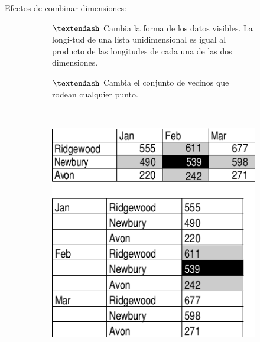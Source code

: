\documentclass{fancyslides}
\begin{document}
\begin{frame}
\misc
{
Efectos de combinar dimensiones:

{
\begin{figure}
        \centering
        \begin{subfigure}[b]{0.4\textwidth}
          $\textendash$ Cambia la forma de los datos visibles. La longi-tud de una lista unidimensional es igual al producto de las longitudes de cada una de las dos dimensiones.
          
          $\textendash$ Cambia el conjunto de vecinos que rodean cualquier punto.
        \end{subfigure}
        ~
        \begin{subfigure}[b]{0.4\textwidth}
          \includegraphics[width=\textwidth]{cube_7}
        \end{subfigure}
\end{figure}
}
}
\end{frame}
\end{document}

